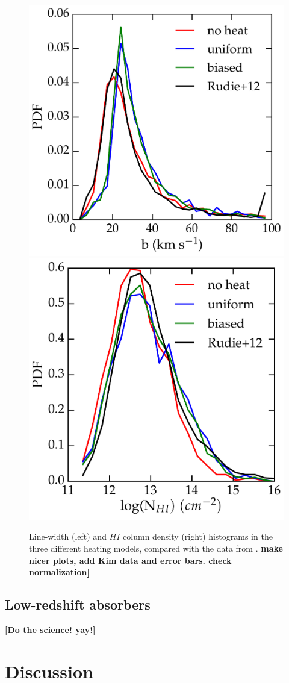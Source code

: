 \documentclass[numberedappendix]{emulateapj}
\newcommand\ALc[1]{{\color{red} \bf #1}} %
\begin{document}
\begin{figure}[h]
\centering
\includegraphics[width = .35\textwidth ]{hist_b_rudie_vs_sims.pdf}
\includegraphics[width = .35\textwidth ]{hist_Nh_rudie_vs_sims.pdf}
\caption{ Line-width (left) and $HI$ column density (right) histograms  in the three different heating models, compared with the data from \citet{2012ApJ...757L..30R}.\ALc{ make nicer plots, add Kim data and error bars. check normalization]}}
\label{fig:b_Nh_1d}
\end{figure}




\subsection{Low-redshift absorbers}
\ALc{[Do the science! yay!]}

\section{Discussion}\label{sec:discussion}
\end{document}
